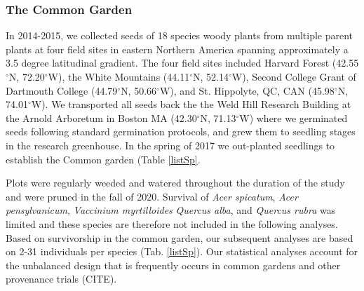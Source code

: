 \documentclass{article}[12pt]
\begin{document}
{\subsubsection{The Common Garden}
In 2014-2015, we collected seeds of 18 species woody plants from multiple parent plants at four field sites in eastern Northern America spanning approximately a 3.5 degree latitudinal gradient. The four field sites included Harvard Forest (42.55$^{\circ}$N, 72.20$^{\circ}$W), the White Mountains (44.11$^{\circ}$N, 52.14$^{\circ}$W), Second College Grant of Dartmouth College (44.79$^{\circ}$N, 50.66$^{\circ}$W), and St. Hippolyte, QC, CAN (45.98$^{\circ}$N, 74.01$^{\circ}$W). We transported all seeds back the the Weld Hill Research Building at the Arnold Arboretum in Boston MA (42.30$^{\circ}$N, 71.13$^{\circ}$W) where we germinated seeds following standard germination protocols, and grew them to seedling stages in the research greenhouse. In the spring of 2017 we out-planted seedlings to establish the Common garden (Table \ref{listSp}. %

Plots were regularly weeded and watered throughout the duration of the study and were pruned in the fall of 2020. Survival of \textit{Acer spicatum}, \textit{Acer pensylvanicum}, \emph{Vaccinium myrtilloides} \textit{Quercus alba}, and \textit{Quercus rubra} was limited and these species are therefore not included in the following analyses. Based on survivorship in the common garden, our subsequent analyses are based on 2-31 individuals per species (Tab. \ref{listSp}). Our statistical analyses account for the unbalanced design that is frequently occurs in common gardens and other provenance trials (CITE).

}
\end{document}
